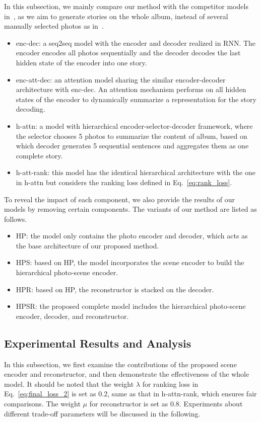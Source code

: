 \documentclass[letterpaper]{article} \usepackage{aaai19}  \usepackage{times}  \usepackage{helvet}  \usepackage{courier}  \usepackage{url}  \usepackage{graphicx}  \usepackage{color}
\begin{document}
In this subsection, we mainly compare our method with the competitor models in~\cite{yu2017hierarchically}, as we aim to generate stories on the whole album, instead of several manually selected photos as in~\cite{wang2018no,liu2017let}.
\begin{itemize}
\item enc-dec: a seq2seq model with the encoder and decoder realized in RNN. The encoder encodes all photos sequentially and the decoder decodes the last hidden state of the encoder into one story.
\item enc-att-dec: an attention model sharing the similar encoder-decoder architecture with enc-dec. An attention mechanism performs on all hidden states of the encoder to dynamically summarize a representation for the story decoding.
\item h-attn: a model with hierarchical encoder-selector-decoder framework, where the selector chooses 5 photos to summarize the content of album, based on which decoder generates 5 sequential sentences and aggregates them as one complete story.
\item h-att-rank: this model has the identical hierarchical architecture with the one in h-attn but considers the ranking loss defined in Eq.~\eqref{eq:rank_loss}.
\end{itemize}

To reveal the impact of each component, we also provide the results of our models by removing certain components. The variants of our method are listed as follows.
\begin{itemize}
\item HP: the model only contains the photo encoder and decoder, which acts as the base architecture of our proposed method.
\item HPS: based on HP, the model incorporates the scene encoder to build the hierarchical photo-scene encoder.
\item HPR: based on HP, the reconstructor is stacked on the decoder.
\item HPSR: the proposed complete model includes the hierarchical photo-scene encoder, decoder, and reconstructor.
\end{itemize}


\subsection{Experimental Results and Analysis}
In this subsection, we first examine the contributions of the proposed scene encoder and reconstructor, and then demonstrate the effectiveness of the whole model. It should be noted that the weight $\lambda$ for ranking loss in Eq.~\eqref{eq:final_loss_2} is set as 0.2, same as that in h-attn-rank, which ensures fair comparisons. The weight $\mu$ for reconstructor is set as 0.8. Experiments about different trade-off parameters will be discussed in the following.
\end{document}
